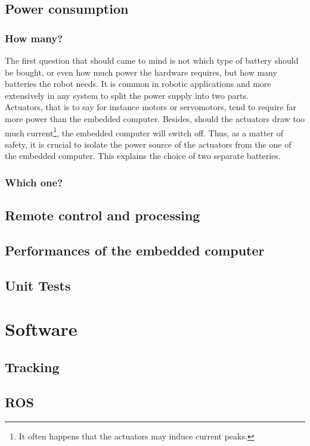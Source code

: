 	\section{Power consumption}
		
		\subsection{How many?}
		The first question that should came to mind is not which type of battery
		should be bought, or even
		how much power the hardware requires, but how many batteries the robot 
		needs. It is common in robotic applications and more 
		extensively in any system to split the power supply into two parts.\cite{racecarj} 
		\\\indent Actuators, that is to say for instance motors
		or servomotors, tend to require far more power than the embedded computer. Besides, 
		should the actuators draw too much current\footnote{It often happens that the 
		actuators may induce current peaks.}, the embedded computer will switch off. Thus, 
		as a matter of safety, it is crucial to isolate the power source of the actuators
		from the one of the embedded computer. This explains the choice of two separate 
		batteries.
		
		\subsection{Which one?}
	
	\section{Remote control and processing}
	
	\section{Performances of the embedded computer}
	
	\section{Unit Tests}


\chapter{Software}\label{software}

	\section{Tracking}\label{tracking}
	
	\section{ROS}\label{ros}